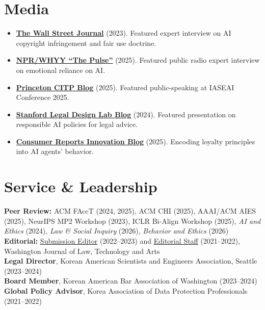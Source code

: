 \documentclass[10pt]{article}
\begin{document}
\section*{Media}
{\small
\begin{itemize}[itemsep=1pt]
\item \href{https://www.wsj.com/amp/articles/ai-chatgpt-dall-e-microsoft-rutkowski-github-artificial-intelligence-11675466857}{\textbf{The Wall Street Journal}} (2023). Featured expert interview on AI copyright infringement and fair use doctrine.
\item \href{https://open.spotify.com/episode/5dVHC4Bjdbo8ACcoRuxV5V}{\textbf{NPR/WHYY ``The Pulse''}} (2025). Featured public radio expert interview on emotional reliance on AI.
\item \href{https://blog.citp.princeton.edu/2025/02/11/balancing-free-speech-safety-envisioning-a-human-centered-first-amendment-for-ai-regulation-techtakes/}{\textbf{Princeton CITP Blog}} (2025). Featured public-speaking at IASEAI Conference 2025.
\item \href{https://medium.com/legal-design-and-innovation/ai-access-to-justice-webinar-series-ai-in-practice-eb297e9adb78}{\textbf{Stanford Legal Design Lab Blog}} (2024). Featured presentation on responsible AI policies for legal advice.
\item \href{https://innovation.consumerreports.org/encoding-loyalty-principles-into-ai-agents-behavior/}{\textbf{Consumer Reports Innovation Blog}} (2025). Encoding loyalty principles into AI agents' behavior.
\end{itemize}
}

\section*{Service \& Leadership}
{\small
\textbf{Peer Review:} ACM FAccT (2024, 2025), ACM CHI (2025), AAAI/ACM AIES (2025), NeurIPS MP2 Workshop (2023), ICLR Bi-Align Workshop (2025), \textit{AI and Ethics} (2024), \textit{Law \& Social Inquiry} (2026), \textit{Behavior and Ethics} (2026)\\
\textbf{Editorial:} \href{https://web.archive.org/web/20230301022116/https://wjlta.com/editorial-team/}{Submission Editor} (2022--2023) and \href{https://web.archive.org/web/20220121090005/https://wjlta.com/editorial-team/}{Editorial Staff} (2021--2022), Washington Journal of Law, Technology and Arts\\
\textbf{Legal Director}, Korean American Scientists and Engineers Association, Seattle (2023--2024)\\
\textbf{Board Member}, Korean American Bar Association of Washington (2023--2024)\\
\textbf{Global Policy Advisor}, Korea Association of Data Protection Professionals (2021--2022)
}
\end{document}
